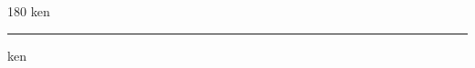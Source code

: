 
\begin{frame}
\begin{center}
\begin{turn}{180}
{\fontsize{2.5cm}{1em}\selectfont ken}
\end{turn}
\vspace{1em}\par  
\hrule
\vspace{1em}\par  
{\fontsize{2.5cm}{1em}\selectfont ken}
\end{center}
\end{frame}
